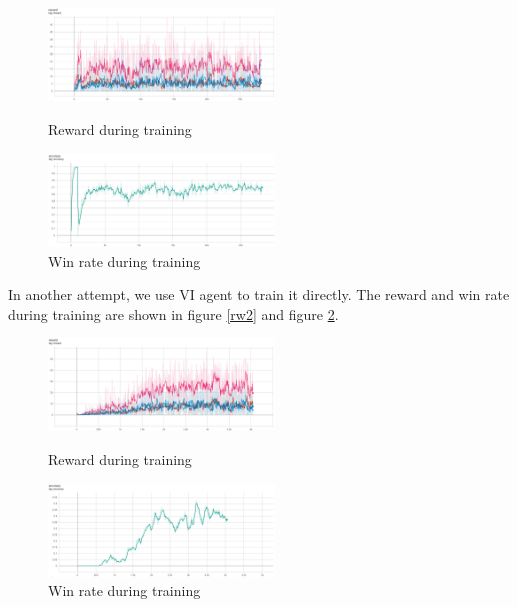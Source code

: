 \documentclass{article}
\begin{document}
\begin{figure}[H]
    \centering
    \begin{minipage}[t]{0.48\textwidth}
        \centering
        \includegraphics[width=6cm]{figs/training_reward_1.png}
        \caption{Reward during training}
        \label{rw1}
    \end{minipage}
    \begin{minipage}[t]{0.48\textwidth}
        \centering
        \includegraphics[width=6cm]{figs/training_win_rate_1.png}
        \caption{Win rate during training}
        \label{wr1}
    \end{minipage}
\end{figure}

In another attempt, we use VI agent to train it directly. The reward and win rate during training are shown in figure \ref{rw2} and figure \ref{wr2}.

\begin{figure}[H]
    \centering
    \begin{minipage}[t]{0.48\textwidth}
        \centering
        \includegraphics[width=6cm]{figs/training_reward.png}
        \caption{Reward during training}
        \label{rw2}
    \end{minipage}
    \begin{minipage}[t]{0.48\textwidth}
        \centering
        \includegraphics[width=6cm]{figs/training_win_rate.png}
        \caption{Win rate during training}
        \label{wr2}
    \end{minipage}
\end{figure}
\end{document}
